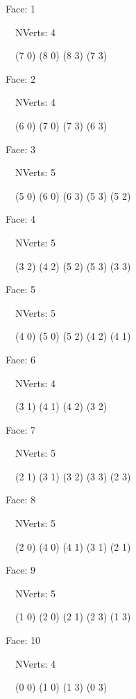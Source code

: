 \documentclass{article}
\begin{document}
{\footnotesize 

Face: 1

\   \    NVerts: 4

 \   \   (7 0) (8 0) (8 3) (7 3)}

{\footnotesize 

Face: 2

\   \    NVerts: 4

 \   \   (6 0) (7 0) (7 3) (6 3)}

{\footnotesize 

Face: 3

\   \    NVerts: 5

 \   \   (5 0) (6 0) (6 3) (5 3) (5 2)}

{\footnotesize 

Face: 4

\   \    NVerts: 5

 \   \   (3 2) (4 2) (5 2) (5 3) (3 3)}

{\footnotesize 

Face: 5

\   \    NVerts: 5

 \   \   (4 0) (5 0) (5 2) (4 2) (4 1)}

{\footnotesize 

Face: 6

\   \    NVerts: 4

 \   \   (3 1) (4 1) (4 2) (3 2)}

{\footnotesize 

Face: 7

\   \    NVerts: 5

 \   \   (2 1) (3 1) (3 2) (3 3) (2 3)}

{\footnotesize 

Face: 8

\   \    NVerts: 5

 \   \   (2 0) (4 0) (4 1) (3 1) (2 1)}

{\footnotesize 

Face: 9

\   \    NVerts: 5

 \   \   (1 0) (2 0) (2 1) (2 3) (1 3)}

{\footnotesize 

Face: 10

\   \    NVerts: 4

 \   \   (0 0) (1 0) (1 3) (0 3)}


 \newpage
\end{document}
